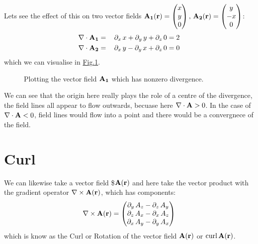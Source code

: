 \documentclass[letterpaper,10pt,english]{jupyterBook}
\begin{document}
\sphinxAtStartPar
Lets see the effect of this on two vector fields \({\bf A_1(r)} = \begin{pmatrix} x \\ y \\ 0\end{pmatrix}, \,{\bf A_2(r)} = \begin{pmatrix} y \\ -x \\ 0\end{pmatrix}\):
\begin{equation*}
\begin{split}\nabla \cdot {\bf A_1} &=&\, \partial_x\, x + \partial_y\, y + \partial_z\, 0 = 2 \\
\nabla \cdot {\bf A_2} &=&\, \partial_x\, y - \partial_y\, x + \partial_z\, 0 = 0 \end{split}
\end{equation*}
\sphinxAtStartPar
which we can visualise in \hyperref[\detokenize{VectorCalculus/divandcurl:div}]{Fig.\@ \ref{\detokenize{VectorCalculus/divandcurl:div}}}.

\begin{figure}[htbp]
\centering
\capstart

\noindent{}
\caption{Plotting the vector field \({\bf A_1}\) which has non\sphinxhyphen{}zero divergence.}\label{\detokenize{VectorCalculus/divandcurl:div}}\end{figure}

\sphinxAtStartPar
We can see that the origin here really plays the role of a centre of the divergence, the field lines all appear to flow outwards, becuase here \(\nabla \cdot {\bf A} > 0\).  In the case of
\(\nabla \cdot {\bf A} < 0\), field lines would flow into a point and there would be a convergnece of the field.


\section{Curl}
\label{\detokenize{VectorCalculus/divandcurl:curl}}
\sphinxAtStartPar
We can likewise take a vector field \$\({\bf A(r)} \) and here take the vector product with the gradient operator \(\nabla\times {\bf A(r)}\), which has components:
\begin{equation*}
\begin{split}\nabla\times {\bf A(r)} = \begin{pmatrix} \partial_y\, A_z - \partial_z\, A_y \\ \partial_z\, A_x - \partial_x\, A_z \\ \partial_x\, A_y - \partial_y\, A_x  \end{pmatrix}\end{split}
\end{equation*}
\sphinxAtStartPar
which is know as the Curl or Rotation of the vector field \(\bf A(r)\) or \(\text{curl}\,{\bf A(r)}\).
\end{document}
